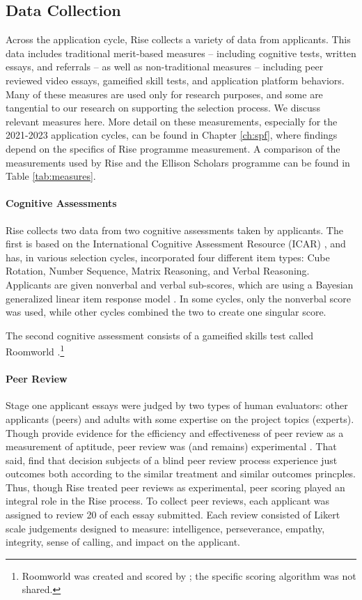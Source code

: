\subsection{Data Collection}
Across the application cycle, Rise collects a variety of data from applicants. This data includes traditional merit-based measures – including cognitive tests, written essays, and referrals – as well as non-traditional measures – including peer reviewed video essays, gameified skill tests, and application platform behaviors. Many of these measures are used only for research purposes, and some are tangential to our research on supporting the selection process. We discuss relevant measures here. More detail on these measurements, especially for the 2021-2023 application cycles, can be found in Chapter \ref{ch:spf}, where findings depend on the specifics of Rise programme measurement. A comparison of the measurements used by Rise and the Ellison Scholars programme can be found in Table \ref{tab:measures}.

\paragraph{Cognitive Assessments}
Rise collects two data from two cognitive assessments taken by applicants. The first is based on the International Cognitive Assessment Resource (ICAR) \cite{condon2014international, subotic2020psychometric}, and has, in various selection cycles, incorporated four different item types: Cube Rotation, Number Sequence, Matrix Reasoning, and Verbal Reasoning. Applicants are given nonverbal and verbal sub-scores, which are using a Bayesian generalized linear item response model \cite{burkner2021bayesian}. In some cycles, only the nonverbal score was used, while other cycles combined the two to create one singular score.

The second cognitive assessment consists of a gameified skills test called Roomworld \cite{Dumbalska_Bhatti_Ali_Summerfield_2023}.\footnote{Roomworld was created and scored by \textcite{Dumbalska_Bhatti_Ali_Summerfield_2023}; the specific scoring algorithm was not shared.}

\paragraph{Peer Review}
Stage one applicant essays were judged by two types of human evaluators: other applicants (peers) and adults with some expertise on the project topics (experts). Though \textcite{Anvari2021EffectivenessOP} provide evidence for the efficiency and effectiveness of peer review as a measurement of aptitude, peer review was (and remains) experimental \cite{Rahmatillah2022AnalyzingFA}. That said, \textcite{VanderSchee2022UsingCP} find that decision subjects of a blind peer review process experience just outcomes both according to the similar treatment and similar outcomes princples. Thus, though Rise treated peer reviews as experimental, peer scoring played an integral role in the Rise process. To collect peer reviews, each applicant was assigned to review 20 of each essay submitted. Each review consisted of Likert scale judgements designed to measure: intelligence, perseverance, empathy, integrity, sense of calling, and impact on the applicant.


